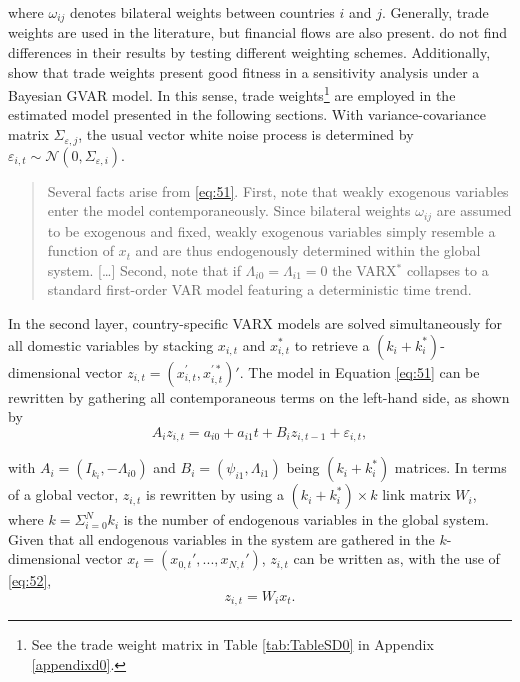 \documentclass[a4paper, twoside]{templates/ociamthesis}
\begin{document}
\noindent where \(\omega_{ij}\) denotes bilateral weights between countries \(i\) and \(j\). Generally, trade weights are used in the literature, but financial flows are also present. \textcite{eickmeier2015} do not find differences in their results by testing different weighting schemes. Additionally, \textcite{feldkircher2016} show that trade weights present good fitness in a sensitivity analysis under a Bayesian GVAR model. In this sense, trade weights\footnote{See the trade weight matrix in Table \ref{tab:TableSD0} in Appendix \ref{appendixd0}.} are employed in the estimated model presented in the following sections. With variance-covariance matrix \(\Sigma_{\varepsilon,j}\), the usual vector white noise process is determined by \(\varepsilon_{i,t} \sim \mathcal{N} (0,\Sigma_{\varepsilon,i})\).

\begin{quote}
Several facts arise from \eqref{eq:51}. First, note that weakly exogenous variables enter the model contemporaneously. Since bilateral weights \(\omega_{ij}\) are assumed to be exogenous and fixed, weakly exogenous variables simply resemble a function of \(x_t\) and are thus endogenously determined within the global system. {[}\ldots{]} Second, note that if \(\Lambda_{i0} = \Lambda_{i1} = 0\) the VARX\(^*\) collapses to a standard first-order VAR model featuring a deterministic time trend. \autocite[ 169]{feldkircher2016}
\end{quote}

In the second layer, country-specific VARX models are solved simultaneously for all domestic variables by stacking \(x_{i,t}\) and \(x_{i,t}^{\ast}\) to retrieve a \((k_i + k_i^*)\)-dimensional vector \(z_{i,t} = (x_{i,t}^{'}, x_{i,t}^{'\ast})'\). The model in Equation \eqref{eq:51} can be rewritten by gathering all contemporaneous terms on the left-hand side, as shown by
\begin{equation}
A_iz_{i,t} = a_{i0} + a_{i1}t + B_iz_{i,t-1} + \varepsilon_{i,t},
\label{eq:53}
\end{equation}

\noindent with \(A_i = (I_{k_i}, -\Lambda_{i0})\) and \(B_i = (\psi_{i1}, \Lambda_{i1})\) being \((k_i + k_i^*)\) matrices. In terms of a global vector, \(z_{i,t}\) is rewritten by using a \((k_i + k_i^*) \times k\) link matrix \(W_i\), where \(k = \Sigma_{i=0}^Nk_i\) is the number of endogenous variables in the global system. Given that all endogenous variables in the system are gathered in the \(k\)-dimensional vector \(x_t = (x_{0,t}', ..., x_{N,t}')\), \(z_{i,t}\) can be written as, with the use of \eqref{eq:52},
\begin{equation}
z_{i,t} = W_ix_t.
\label{eq:54}
\end{equation}
\end{document}
